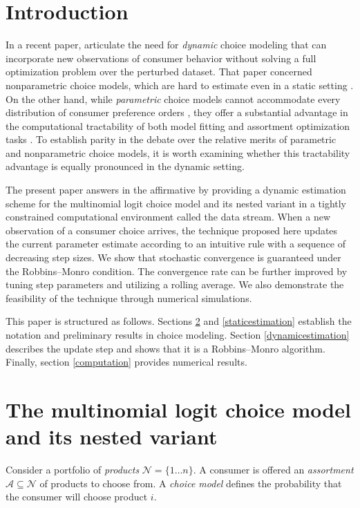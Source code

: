 \documentclass[preprint,12pt,authoryear]{elsarticle}
\begin{document}


\section{Introduction}
In a recent paper, \cite{honguyen2021} articulate the need for \emph{dynamic} choice modeling that can incorporate new observations of consumer behavior without solving a full optimization problem over the perturbed dataset. That paper concerned nonparametric choice models, which are hard to estimate even in a static setting \cite[][]{rusmevichientong2006, farias2013}. On the other hand, while \emph{parametric} choice models cannot accommodate every distribution of consumer preference orders \cite[][]{keane1997}, they offer a substantial advantage in the computational tractability of both model fitting and assortment optimization tasks \cite[][]{bunch1987, davis2014}. To establish parity in the debate over the relative merits of parametric and nonparametric choice models, it is worth examining whether this tractability advantage is equally pronounced in the dynamic setting. 

The present paper answers in the affirmative by providing a dynamic estimation scheme for the multinomial logit choice model and its nested variant in a tightly constrained computational environment called the data stream. When a new observation of a consumer choice arrives, the technique proposed here updates the current parameter estimate according to an intuitive rule with a sequence of decreasing step sizes. We show that stochastic convergence is guaranteed under the Robbins--Monro condition. The convergence rate can be further improved by tuning step parameters and utilizing a rolling average. We also demonstrate the feasibility of the technique through numerical simulations.

This paper is structured as follows. Sections \ref{modeldescription} and \ref{staticestimation} establish the notation and preliminary results in choice modeling. Section \ref{dynamicestimation} describes the update step and shows that it is a Robbins--Monro algorithm. Finally, section \ref{computation} provides numerical results.

\section{The multinomial logit choice model and its nested variant} \label{modeldescription}
Consider a portfolio of \emph{products} $\mathcal{N} = \{1 \dots n\}$. A consumer is offered an \emph{assortment} $\mathcal{A} \subseteq \mathcal{N}$ of products to choose from. A \emph{choice model} defines the probability that the consumer will choose product $i$.
\end{document}
